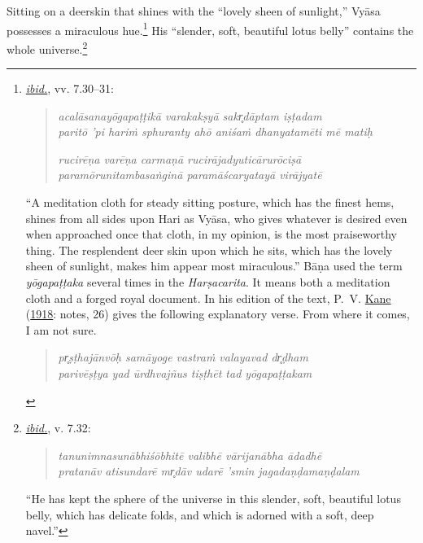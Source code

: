  Sitting on a deerskin that shines with the “lovely sheen of sunlight,” Vyāsa possesses a miraculous hue.\footnote{%
\hyperref[NarayanaPandita2017]{\emph{ibid.}}, vv. 7.30–31:\setlength{\parindent}{2em}

\vspace{-1.5ex}\begin{quote}\raggedright
      \emph{acalāsanayōgapaṭṭikā varakakṣyā sakr̥dāptam iṣṭadam}\\
\emph{paritō ’pi hariṁ sphuranty ahō aniśaṁ dhanyatamēti mē matiḥ}

\emph{rucirēṇa varēṇa carmaṇā rucirājadyuticārurōciṣā}\\
\emph{paramōrunitambasaṅginā paramāścaryatayā virājyatē}\end{quote}\vspace{-1.5ex}
      

\noindent{}“A meditation cloth for steady sitting posture, which has the finest hems, shines from all sides upon Hari as Vyāsa, who gives whatever is desired even when approached once  \Dash  that cloth, in my opinion, is the most praiseworthy thing. The resplendent deer skin upon which he sits, which has the lovely sheen of sunlight, makes him appear most miraculous.” Bāṇa used the term \emph{yōgapaṭṭaka} several times in the \emph{{Harṣacarita}}. It means both a meditation cloth and a forged royal document. In his edition of the text, P. V. \hyperref[Kane1918]{Kane} (\hyperref[Kane1918]{1918}: notes, 26) gives the following explanatory verse. From where it comes, I am not sure.

\vspace{-1.5ex}\begin{quote}\raggedright
      \emph{pr̥ṣṭhajānvōḥ samāyoge vastraṁ valayavad dr̥ḍham}\\
\emph{parivēṣṭya yad ūrdhvajñus tiṣṭhēt tad yōgapaṭṭakam}\end{quote}\vspace{-1.5ex}
      }
 His “slender, soft, beautiful lotus belly” contains the whole universe.\footnote{%
\hyperref[NarayanaPandita2017]{\emph{ibid.}}, v. 7.32:\setlength{\parindent}{2em}

\vspace{-1.5ex}\begin{quote}\raggedright
      \emph{tanunimnasunābhiśōbhitē valibhē vārijanābha ādadhē}\\
\emph{pratanāv atisundarē mr̥dāv udarē ’smin jagadaṇḍamaṇḍalam}\end{quote}\vspace{-1.5ex}
      

\noindent{}“He has kept the sphere of the universe in this slender, soft, beautiful lotus belly, which has delicate folds, and which is adorned with a soft, deep navel.”
}
